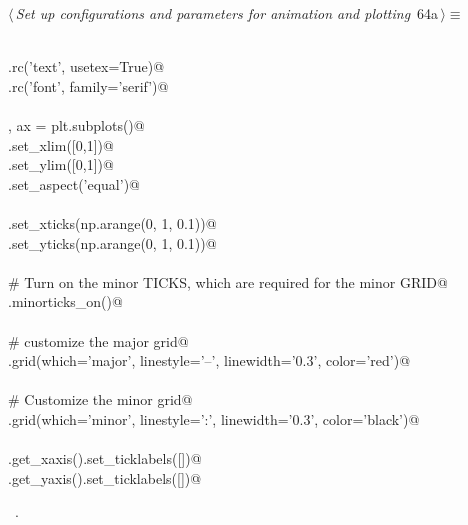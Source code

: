 \documentclass[11.5pt]{report}
\begin{document}
\begin{flushleft} \small
\begin{minipage}{\linewidth}\label{scrap92}\raggedright\small
{} $\langle\,${\itshape Set up configurations and parameters for animation and plotting}\nobreak\ {\footnotesize {64a}}$\,\rangle\equiv$
\vspace{-1ex}
\begin{list}{}{} \item
\mbox{}\verb@@\\
\mbox{}\verb@plt.rc('text', usetex=True)@\\
\mbox{}\verb@plt.rc('font', family='serif')@\\
\mbox{}\verb@@\\
\mbox{}\verb@fig, ax = plt.subplots()@\\
\mbox{}\verb@ax.set_xlim([0,1])@\\
\mbox{}\verb@ax.set_ylim([0,1])@\\
\mbox{}\verb@ax.set_aspect('equal')@\\
\mbox{}\verb@@\\
\mbox{}\verb@ax.set_xticks(np.arange(0, 1, 0.1))@\\
\mbox{}\verb@ax.set_yticks(np.arange(0, 1, 0.1))@\\
\mbox{}\verb@@\\
\mbox{}\verb@# Turn on the minor TICKS, which are required for the minor GRID@\\
\mbox{}\verb@ax.minorticks_on()@\\
\mbox{}\verb@@\\
\mbox{}\verb@# customize the major grid@\\
\mbox{}\verb@ax.grid(which='major', linestyle='--', linewidth='0.3', color='red')@\\
\mbox{}\verb@@\\
\mbox{}\verb@# Customize the minor grid@\\
\mbox{}\verb@ax.grid(which='minor', linestyle=':', linewidth='0.3', color='black')@\\
\mbox{}\verb@@\\
\mbox{}\verb@ax.get_xaxis().set_ticklabels([])@\\
\mbox{}\verb@ax.get_yaxis().set_ticklabels([])@\\
\mbox{}\verb@@{\NWsep}
\end{list}
\vspace{-1.5ex}
\footnotesize
\begin{list}{}{\setlength{\itemsep}{-\parsep}\setlength{\itemindent}{-\leftmargin}}
\item \NWtxtMacroRefIn\ .

\item{}
\end{list}
\end{minipage}\vspace{4ex}
\end{flushleft}
\end{document}
